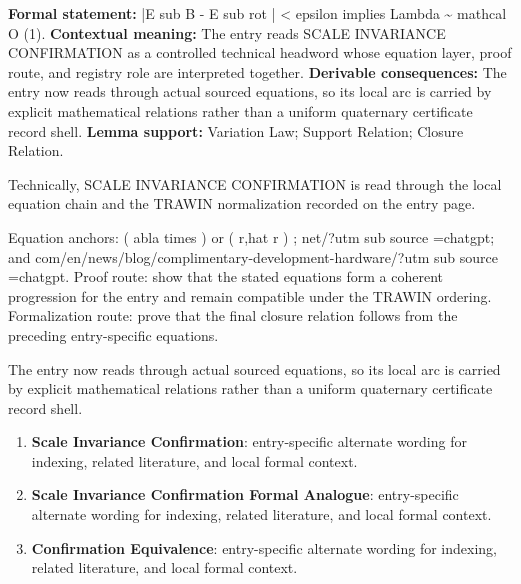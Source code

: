 \begingroup\footnotesize\setlength{\emergencystretch}{3em}\sloppy
\textbf{Formal statement:} |E sub B - E sub rot | < epsilon implies Lambda \textasciitilde{} mathcal O (1). \textbf{Contextual meaning:} The entry reads SCALE INVARIANCE CONFIRMATION as a controlled technical headword whose equation layer, proof route, and registry role are interpreted together. \textbf{Derivable consequences:} The entry now reads through actual sourced equations, so its local arc is carried by explicit mathematical relations rather than a uniform quaternary certificate record shell. \textbf{Lemma support:} Variation Law; Support Relation; Closure Relation.\par
\endgroup

Technically, SCALE INVARIANCE CONFIRMATION is read through the local equation chain and the TRAWIN normalization recorded on the entry page.

Equation anchors: ( abla times ) or ( r,hat r ) ; net/?utm sub source =chatgpt; and com/en/news/blog/complimentary-development-hardware/?utm sub source =chatgpt. Proof route: show that the stated equations form a coherent progression for the entry and remain compatible under the TRAWIN ordering. Formalization route: prove that the final closure relation follows from the preceding entry-specific equations.

The entry now reads through actual sourced equations, so its local arc is carried by explicit mathematical relations rather than a uniform quaternary certificate record shell.
\endgroup

\begin{enumerate}[leftmargin=1.6em,itemsep=6pt,topsep=4pt]
\item \textbf{Scale Invariance Confirmation}: entry-specific alternate wording for indexing, related literature, and local formal context.
\item \textbf{Scale Invariance Confirmation Formal Analogue}: entry-specific alternate wording for indexing, related literature, and local formal context.
\item \textbf{Confirmation Equivalence}: entry-specific alternate wording for indexing, related literature, and local formal context.
\end{enumerate}

